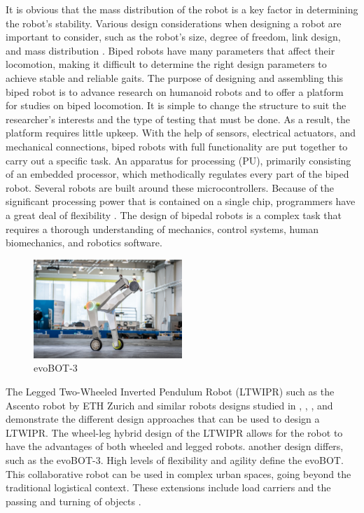 It is obvious that the mass distribution of the robot is a key factor in determining the robot's stability.
Various design considerations when designing a robot are important to consider, such as the robot's size, degree of freedom, link design, and mass distribution \cite{nath2017design}.
Biped robots have many parameters that affect their locomotion, making it difficult to determine the right design parameters to achieve stable and reliable gaits.
The purpose of designing and assembling this biped robot is to advance research on humanoid robots and to offer a platform for studies on biped locomotion.
It is simple to change the structure to suit the researcher's interests and the type of testing that must be done.
As a result, the platform requires little upkeep.
With the help of sensors, electrical actuators, and mechanical connections, biped robots with full functionality are put together to carry out a specific task.
An apparatus for processing (PU), primarily consisting of an embedded processor, which methodically regulates every part of the biped robot.
Several robots are built around these microcontrollers.
Because of the significant processing power that is contained on a single chip, programmers have a great deal of flexibility \cite{madadi2007design}.
 The design of bipedal robots is a complex task that requires a thorough understanding of mechanics, control systems, human biomechanics, and robotics software.

\begin {figure}[h]
\centering
\includegraphics[width=0.5\textwidth]{evoBOT-3}
\caption{evoBOT-3 \cite{klokowski2023evobot}}
\label{fig:evoBOT-3}
\end {figure}

The Legged Two-Wheeled Inverted Pendulum Robot (LTWIPR) such as the Ascento robot by ETH Zurich \cite{klemm2019ascento} and similar robots designs studied in \cite{guo2022design}, \cite{zhang2022dynamic}, \cite{cui2022modeling}, \cite{hsu2022implementation} and \cite{xin2020online} demonstrate the different design approaches that can be used to design a LTWIPR. The wheel-leg hybrid design of the LTWIPR allows for the robot to have the advantages of both wheeled and legged robots.
another design differs, such as the evoBOT-3.
High levels of flexibility and agility define the evoBOT. This collaborative robot can be used in complex urban spaces, going beyond the traditional logistical context.
These extensions include load carriers and the passing and turning of objects \cite{klokowski2023evobot}.

